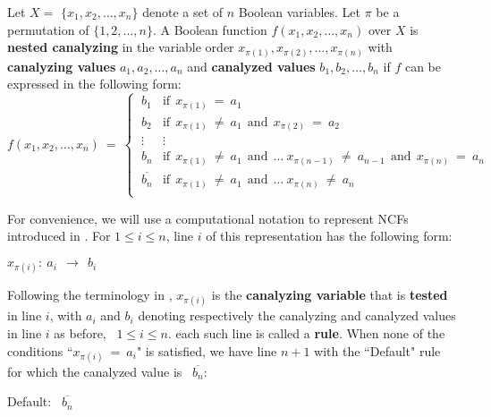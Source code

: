 \begin{definition}\label{def:nested_canalyzing}
Let $X = $ $\{x_1, x_2, \ldots, x_n\}$ denote a set of $n$  Boolean variables.
Let $\pi$ be a permutation of $\{1, 2, \ldots, n\}$.
A Boolean function $f(x_1, x_2, \ldots, x_n)$ over $X$ is \textbf{nested canalyzing}
in the variable order $x_{\pi(1)}, x_{\pi(2)}, \ldots, x_{\pi(n)}$ with
\textbf{canalyzing values} $a_1, a_2, \ldots, a_n$ and 
\textbf{canalyzed values} $b_1, b_2, \ldots, b_n$ 
if $f$ can be expressed in the following form:
\[
f(x_1, x_2, \ldots, x_n) ~=~ 
   \begin{cases}
       \:b_1 & \mathrm{if~~} x_{\pi(1)} ~=~ a_1 \\
       \:b_2 & \mathrm{if~~} x_{\pi(1)} ~\neq~ a_1 \mathrm{~~and~~}
            x_{\pi(2)} ~=~ a_2 \\
       \:\vdots & \vdots \\
       \:b_n & \mathrm{if~~} x_{\pi(1)} ~\neq~ a_1 \mathrm{~~and~~} \ldots~
             x_{\pi(n-1)} ~\neq~ a_{n-1} \mathrm{~~and~~} x_{\pi(n)} ~=~ a_n \\
       \:\overline{b_n} & \mathrm{if~~} x_{\pi(1)} ~\neq~ a_1 \mathrm{~~and~~} \ldots~
            x_{\pi(n)} ~\neq~ a_n \\
   \end{cases}
\]
\end{definition}

\medskip
For convenience, we will use a computational notation to represent NCFs
introduced in \cite{Stearns-etal-2018}.
For $1 \leq i \leq n$, line $i$ of this representation has the following form:

\medskip

\noindent
\hspace*{1.1in} $x_{\pi(i)}:~ a_i ~~\longrightarrow~~ b_i$

\medskip

\noindent 
Following the terminology in \cite{Stearns-etal-2018},
 $x_{\pi(i)}$ is the \textbf{canalyzing variable} that is
\textbf{tested} in line $i$, 
with $a_i$ and $b_i$ denoting respectively the canalyzing and 
canalyzed values in line $i$ as before,~ $1 \leq i \leq n$.
each such line is called a \textbf{rule}.
When none of the conditions ``$x_{\pi(i)} ~=~ a_i$" 
is satisfied, we have line $n+1$ with the ``Default" rule
for which the canalyzed value is~ $\overline{b_n}$: 

\medskip

\noindent
\hspace*{1.1in} Default:~ $\overline{b_n}$

